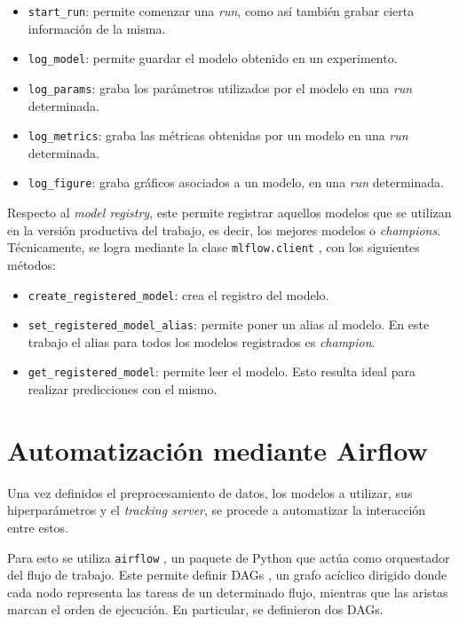 \begin{itemize}
    \item \texttt{start\_run}: permite comenzar una \textit{run}, como así también grabar cierta información de la misma.
    \item \texttt{log\_model}: permite guardar el modelo obtenido en un experimento.
    \item \texttt{log\_params}: graba los parámetros utilizados por el modelo en una \textit{run} determinada.
    \item \texttt{log\_metrics}: graba las métricas obtenidas por un modelo en una \textit{run} determinada.
    \item \texttt{log\_figure}: graba gráficos asociados a un modelo, en una \textit{run} determinada.
\end{itemize}

Respecto al \textit{model registry}, este permite registrar aquellos modelos que se utilizan en la versión productiva del trabajo, es decir, los mejores modelos o \textit{champions}. Técnicamente, se logra mediante la clase \texttt{mlflow.client} \citep{WEBSITE:mlflow_client_api}, con los siguientes métodos:
\begin{itemize}
    \item \texttt{create\_registered\_model}: crea el registro del modelo.
    \item \texttt{set\_registered\_model\_alias}: permite poner un alias al modelo. En este trabajo el alias para todos los modelos registrados es \textit{champion}.
    \item \texttt{get\_registered\_model}: permite leer el modelo. Esto resulta ideal para realizar predicciones con el mismo.
\end{itemize}

\section{Automatización mediante Airflow}
\label{sec:automatizacion_airflow}

Una vez definidos el preprocesamiento de datos, los modelos a utilizar, sus hiperparámetros y el \textit{tracking server}, se procede a automatizar la interacción entre estos.

Para esto se utiliza \texttt{airflow} \citep{WEBSITE:airflow}, un paquete de Python que actúa como orquestador del flujo de trabajo. Este permite definir DAGs \citep{WEBSITE:airflow_dags}, un grafo acíclico dirigido donde cada nodo representa las tareas de un determinado flujo, mientras que las aristas marcan el orden de ejecución. En particular, se definieron dos DAGs.


